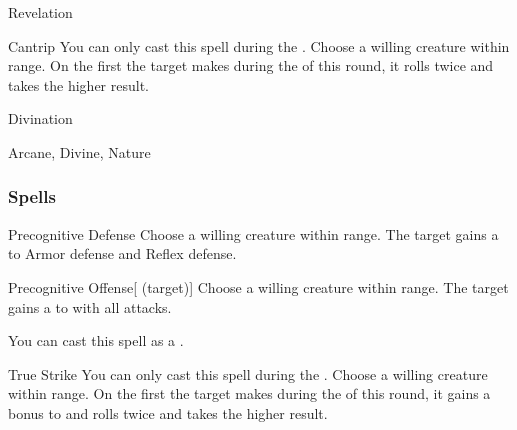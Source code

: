 \newpage
\begin{spellsection}{Revelation}

\begin{spellheader}
\end{spellheader}


\begin{ability}{Cantrip}
You can only cast this spell during the .
Choose a willing creature within \rngclose range.
On the first  the target makes during the  of this round, it rolls twice and takes the higher result.
\end{ability}




 Divination

 Arcane, Divine, Nature
\end{spellsection}


\subsubsection{Spells}


\begin{ability}[\nth{1}]{Precognitive Defense}
Choose a willing creature within \rngclose range.
The target gains a   to Armor defense and Reflex defense.
\end{ability}
\vspace{0.25em}



\begin{ability}[\nth{1}]{Precognitive Offense}[ (target)]
Choose a willing creature within \rngclose range.
The target gains a   to  with all attacks.

You can cast this spell as a .
\end{ability}
\vspace{0.25em}



\begin{ability}[\nth{1}]{True Strike}
You can only cast this spell during the .
Choose a willing creature within \rngclose range.
On the first  the target makes during the  of this round, it gains a  bonus to  and rolls twice and takes the higher result.
\end{ability}
\vspace{0.25em}



